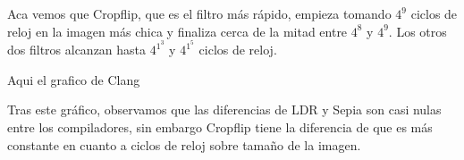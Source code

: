 Aca vemos que Cropflip, que es el filtro más rápido, empieza tomando $4^9$ ciclos de reloj en la imagen más chica y finaliza cerca de la mitad entre $4^8$ y $4^9$.
Los otros dos filtros alcanzan hasta $4^1^3$ y $4^1^5$ ciclos de reloj.

Aqui el grafico de Clang

\begin{figure}[H]
    \centering
    \begin{floatrow}
    \end{floatrow}
\end{figure}

Tras este gráfico, observamos que las diferencias de LDR y Sepia son casi nulas entre los compiladores, sin embargo Cropflip tiene la diferencia de que es más
constante en cuanto a ciclos de reloj sobre tamaño de la imagen.


